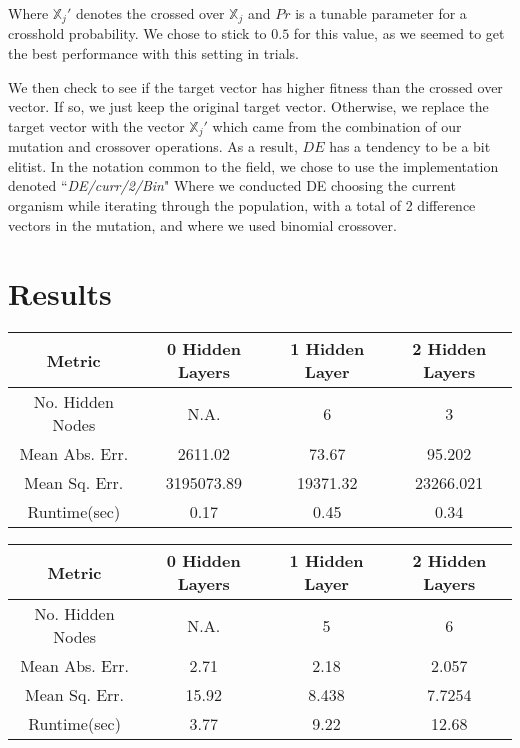 \documentclass[twoside,11pt]{article}
\begin{document}
\begin{enumerate}
		Where $\mathbb{X}_j'$ denotes the crossed over $\mathbb{X}_j$ and $Pr$ is a tunable parameter for a crosshold probability. We chose to stick to $0.5$ for this
		value, as we seemed to get the best performance with this setting in trials.

		We then check to see if the target vector has higher fitness than the crossed over vector. If so, we just keep the original target vector. Otherwise, we replace
		the target vector with the vector $\mathbb{X}_j'$ which came from the combination of our mutation and crossover operations. As a result, $DE$ has a tendency to
		be a bit elitist. In the notation common to the field, we chose to use the implementation denoted ``\textit{DE/curr/2/Bin}" Where we conducted DE choosing the 
		current organism while iterating through the population, with a total of 2 difference vectors in the mutation, and where we used binomial crossover. 
\end{enumerate}

\section{Results}
\begin{center}
	\begin{tabular}{|c c c c|}
		\hline
		Metric & 0 Hidden Layers & 1 Hidden Layer & 2 Hidden Layers \\ [0.5ex]
		\hline \hline
		No. Hidden Nodes & N.A. & 6 & 3 \\
		\hline
		Mean Abs. Err. & 2611.02 & 73.67 & 95.202 \\
		\hline
		Mean Sq. Err. & 3195073.89 & 19371.32 & 23266.021 \\
		\hline
		Runtime(sec) & 0.17 & 0.45 & 0.34 \\
		\hline
	\end{tabular}
\end{center}

\begin{center}
	\begin{tabular}{|c c c c|}
		\hline
		Metric & 0 Hidden Layers & 1 Hidden Layer & 2 Hidden Layers \\ [0.5ex]
		\hline \hline
		No. Hidden Nodes & N.A. & 5 & 6 \\
		\hline
		Mean Abs. Err. & 2.71 & 2.18 & 2.057 \\
		\hline
		Mean Sq. Err. & 15.92 & 8.438 & 7.7254 \\
		\hline
		Runtime(sec) & 3.77 & 9.22 & 12.68 \\
		\hline
	\end{tabular}
\end{center}
\end{document}
